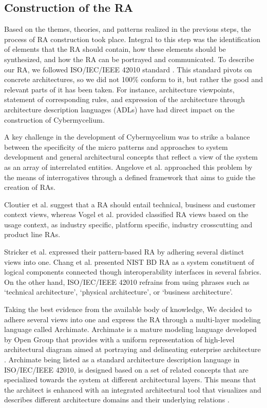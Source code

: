 \documentclass{bmcart}
\begin{document}
\subsection{Construction of the RA}

Based on the themes, theories, and patterns realized in the previous steps, the process of RA construction took place. Integral to this step was the identification of elements that the RA should contain, how these elements should be synthesized, and how the RA can be portrayed and communicated. To describe our RA, we followed ISO/IEC/IEEE 42010 standard \cite{ISO42010}. This standard pivots on concrete architectures, so we did not 100\% conform to it, but rather the good and relevant parts of it has been taken. For instance, architecture viewpoints, statement of corresponding rules, and expression of the architecture through architecture description languages (ADLs) have had direct impact on the construction of Cybermycelium.

A key challenge in the development of Cybermycelium was to strike a balance between the specificity of the micro patterns and approaches to system development and general architectural concepts that reflect a view of the system as an array of interrelated entities. Angelove et al. \cite{angelov2012framework} approached this problem by the means of interrogatives through a defined framework that aims to guide the creation of RAs.

Cloutier et al. \cite{Cloutier} suggest that a RA should entail technical, business and customer context views, whereas Vogel et al. \cite{vogel2009software} provided classified RA views based on the usage context, as industry specific, platform specific, industry crosscutting and product line RAs.

Stricker et al. \cite{Stricker} expressed their pattern-based RA by adhering several distinct views into one. Chang et al. \cite{Chang} presented NIST BD RA as a system constituent of logical components connected though interoperability interfaces in several fabrics. On the other hand, ISO/IEC/IEEE 42010 refrains from using phrases such as `technical architecture', `physical architecture', or `business architecture'.

Taking the best evidence from the available body of knowledge, We decided to adhere several views into one and express the RA through a multi-layer modeling language called Archimate. Archimate is a mature modeling language developed by Open Group that provides with a uniform representation of high-level architectural diagram aimed at portraying and delineating enterprise architecture \cite{lankhorst2013language}. Archimate being listed as a standard architecture description language in ISO/IEC/IEEE 42010, is designed based on a set of related concepts that are specialized towards the system at different architectural layers. This means that the architect is enhanced with an integrated architectural tool that visualizes and describes different architecture domains and their underlying relations \cite{lankhorst2010anatomy,engelsman2011extending}.
\end{document}
